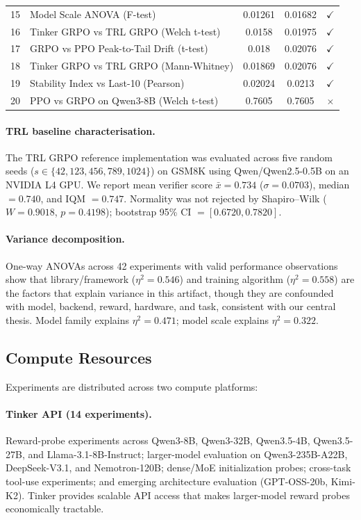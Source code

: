 \begin{table}[!ht]
\begin{tabular}{@{}rp{6.2cm}ccc@{}}
        15 & Model Scale ANOVA (F-test) & 0.01261 & 0.01682 & $\checkmark$ \\
        16 & Tinker GRPO vs TRL GRPO (Welch t-test) & 0.0158 & 0.01975 & $\checkmark$ \\
        17 & GRPO vs PPO Peak-to-Tail Drift (t-test) & 0.018 & 0.02076 & $\checkmark$ \\
        18 & Tinker GRPO vs TRL GRPO (Mann-Whitney) & 0.01869 & 0.02076 & $\checkmark$ \\
        19 & Stability Index vs Last-10 (Pearson) & 0.02024 & 0.0213 & $\checkmark$ \\
        20 & PPO vs GRPO on Qwen3-8B (Welch t-test) & 0.7605 & 0.7605 & $\times$ \\
\bottomrule
\end{tabular}
\end{table}

\paragraph{TRL baseline characterisation.}
The TRL GRPO reference implementation was evaluated across five random seeds
($s \in \{42, 123, 456, 789, 1024\}$) on GSM8K using Qwen/Qwen2.5-0.5B on
an NVIDIA L4 GPU. We report mean verifier score $\bar{x} = 0.734$ ($\sigma = 0.0703$),
median $= 0.740$, and IQM $= 0.747$. Normality was not rejected by Shapiro--Wilk
($W = 0.9018$, $p = 0.4198$); bootstrap 95\% CI $= [0.6720, 0.7820]$.

\paragraph{Variance decomposition.}
One-way ANOVAs across 42 experiments with valid performance observations show
that library/framework ($\eta^2 = 0.546$) and training algorithm ($\eta^2 = 0.558$)
are the factors that explain variance in this artifact, though they are confounded with model, backend, reward, hardware, and task, consistent with our central thesis. Model
family explains $\eta^2 = 0.471$; model scale explains $\eta^2 = 0.322$.

\subsection{Compute Resources}

Experiments are distributed across two compute platforms:

\paragraph{Tinker API (14 experiments).}
Reward-probe experiments across Qwen3-8B, Qwen3-32B, Qwen3.5-4B, Qwen3.5-27B,
and Llama-3.1-8B-Instruct; larger-model evaluation on Qwen3-235B-A22B,
DeepSeek-V3.1, and Nemotron-120B; dense/MoE initialization probes; cross-task
tool-use experiments; and emerging architecture evaluation (GPT-OSS-20b,
Kimi-K2). Tinker provides scalable API access that makes larger-model
reward probes economically tractable.

